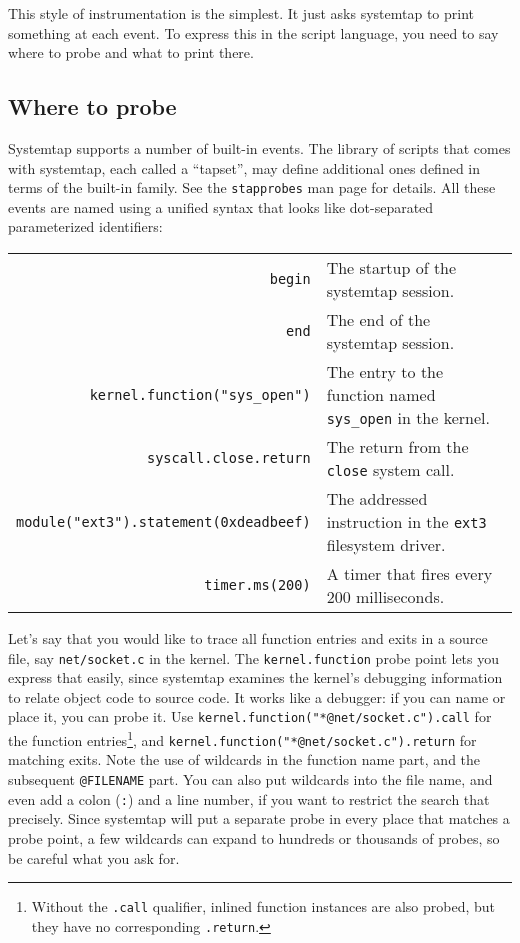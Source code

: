 \documentclass{article}
\renewcommand{\nomenclature}[2]{}
\begin{document}
This style of instrumentation is the simplest.  It just asks systemtap
to print something at each event.  To express this in the script
language, you need to say where to probe and what to print there.

\subsection{Where to probe}

Systemtap supports a number of built-in events.  The library of
scripts that comes with systemtap, each called a ``tapset'', may
define additional ones defined in terms of the built-in family.  See
the \verb+stapprobes+ man page for details.  \nomenclature{tapset}{A
reusable script forming part of the automatically searched tapset
library.}  All these events are named using a unified syntax that
looks like dot-separated parameterized identifiers:

\begin{tabular}{rl}
\verb+begin+ & The startup of the systemtap session. \\
\verb+end+ & The end of the systemtap session. \\
\verb+kernel.function("sys_open")+ & The entry to the function named
\verb+sys_open+ in the kernel. \\
\verb+syscall.close.return+ & The return from the \verb+close+ system
call. \\
\verb+module("ext3").statement(0xdeadbeef)+ & The addressed instruction
in the \verb+ext3+ filesystem driver. \\
\verb+timer.ms(200)+ & A timer that fires every 200 milliseconds. \\
\end{tabular}

Let's say that you would like to trace all function entries and exits
in a source file, say \verb+net/socket.c+ in the kernel.  The
\verb+kernel.function+ probe point lets you express that easily, since
systemtap examines the kernel's debugging information to relate object
code to source code.  It works like a debugger: if you can name or
place it, you can probe it.  Use
\verb+kernel.function("*@net/socket.c").call+ for the function
entries\footnote{Without the {\tt .call} qualifier, inlined function
instances are also probed, but they have no corresponding {\tt .return}.},
and \verb+kernel.function("*@net/socket.c").return+ for matching exits.  Note
the use of wildcards in the function name part, and the subsequent
\verb+@FILENAME+ part.  You can also put wildcards into the file name,
and even add a colon (\verb+:+) and a line number, if you want to
restrict the search that precisely.  Since systemtap will put a
separate probe in every place that matches a probe point, a few
wildcards can expand to hundreds or thousands of probes, so be careful
what you ask for.  \nomenclature{debug information}{Data created by the
compiler when the kernel or application was built, sometimes packaged into
{\tt debuginfo} files, for use by a symbolic debugger.}
\nomenclature{wildcard}{Presence of \verb+*+ globbing patterns in probe points.}
\end{document}
